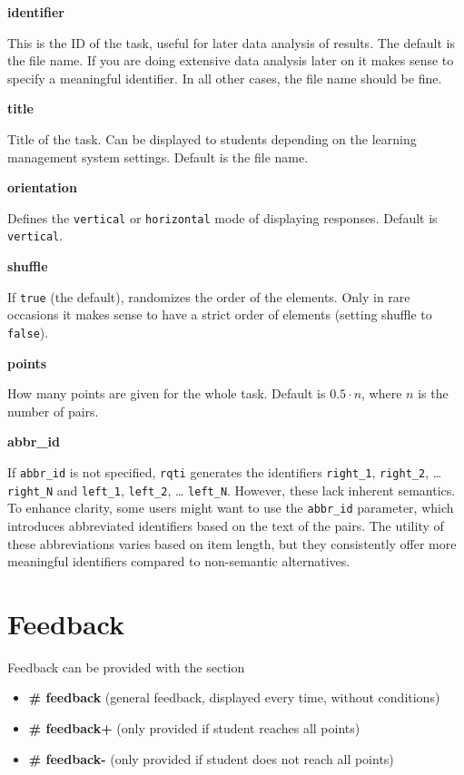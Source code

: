 \documentclass[twoside]{tufte-book}
\providecommand{\tightlist}{%
  \setlength{\itemsep}{0pt}\setlength{\parskip}{0pt}}
\begin{document}
\noindent\textbf{identifier}\label{identifier-6}

This is the ID of the task, useful for later data analysis of results. The default is the file name. If you are doing extensive data analysis later on it makes sense to
specify a meaningful identifier. In all other cases, the file name should be
fine.

\noindent\textbf{title}\label{title-6}

Title of the task. Can be displayed to students depending on
the learning management system settings. Default is the file name.

\noindent\textbf{orientation}\label{orientation-2}

Defines the \texttt{vertical} or \texttt{horizontal} mode of displaying responses. Default is \texttt{vertical}.

\noindent\textbf{shuffle}\label{shuffle-3}

If \texttt{true} (the default), randomizes the order of the elements. Only in rare occasions it makes sense to have a strict order of elements (setting shuffle to \texttt{false}).

\noindent\textbf{points}\label{points-7}

How many points are given for the whole task. Default is \(0.5\cdot n\), where \(n\) is the number of pairs.

\noindent\textbf{abbr\_id}\label{abbr_id}

If \texttt{abbr\_id} is not specified, \texttt{rqti} generates the identifiers \texttt{right\_1}, \texttt{right\_2}, \ldots{} \texttt{right\_N} and \texttt{left\_1}, \texttt{left\_2}, \ldots{} \texttt{left\_N}. However, these lack inherent semantics. To enhance clarity, some users might want to use the \texttt{abbr\_id} parameter, which introduces abbreviated identifiers based on the text of the pairs. The utility of these abbreviations varies based on item length, but they consistently offer more meaningful identifiers compared to non-semantic alternatives.

\section{Feedback}\label{feedback-6}

Feedback can be provided with the section

\begin{itemize}
\tightlist
\item
  \textbf{\# feedback} (general feedback, displayed every time, without conditions)
\item
  \textbf{\# feedback+} (only provided if student reaches all points)
\item
  \textbf{\# feedback-} (only provided if student does not reach all points)
\end{itemize}
\end{document}
